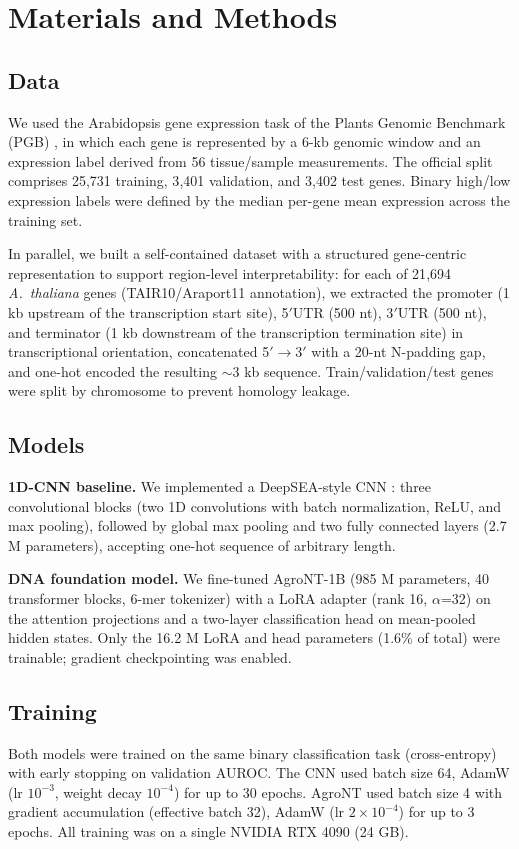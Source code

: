 \documentclass[11pt,a4paper]{article}
\begin{document}
\section{Materials and Methods}
\subsection{Data}
We used the Arabidopsis gene expression task of the Plants Genomic Benchmark (PGB) \cite{pgb2024,mendoza2024}, in which each gene is represented by a 6-kb genomic window and an expression label derived from 56 tissue/sample measurements. The official split comprises 25{,}731 training, 3{,}401 validation, and 3{,}402 test genes. Binary high/low expression labels were defined by the median per-gene mean expression across the training set.

In parallel, we built a self-contained dataset with a structured gene-centric representation to support region-level interpretability: for each of 21{,}694 \emph{A.\ thaliana} genes (TAIR10/Araport11 annotation), we extracted the promoter (1 kb upstream of the transcription start site), 5$'$UTR (500 nt), 3$'$UTR (500 nt), and terminator (1 kb downstream of the transcription termination site) in transcriptional orientation, concatenated 5$'$$\rightarrow$3$'$ with a 20-nt N-padding gap, and one-hot encoded the resulting $\sim$3 kb sequence. Train/validation/test genes were split by chromosome to prevent homology leakage.

\subsection{Models}
\textbf{1D-CNN baseline.} We implemented a DeepSEA-style CNN \cite{zhou2015}: three convolutional blocks (two 1D convolutions with batch normalization, ReLU, and max pooling), followed by global max pooling and two fully connected layers (2.7 M parameters), accepting one-hot sequence of arbitrary length.

\textbf{DNA foundation model.} We fine-tuned AgroNT-1B \cite{mendoza2024} (985 M parameters, 40 transformer blocks, 6-mer tokenizer) with a LoRA adapter (rank 16, $\alpha$=32) on the attention projections and a two-layer classification head on mean-pooled hidden states. Only the 16.2 M LoRA and head parameters (1.6\% of total) were trainable; gradient checkpointing was enabled.

\subsection{Training}
Both models were trained on the same binary classification task (cross-entropy) with early stopping on validation AUROC. The CNN used batch size 64, AdamW (lr $10^{-3}$, weight decay $10^{-4}$) for up to 30 epochs. AgroNT used batch size 4 with gradient accumulation (effective batch 32), AdamW (lr $2\times10^{-4}$) for up to 3 epochs. All training was on a single NVIDIA RTX 4090 (24 GB).
\end{document}
